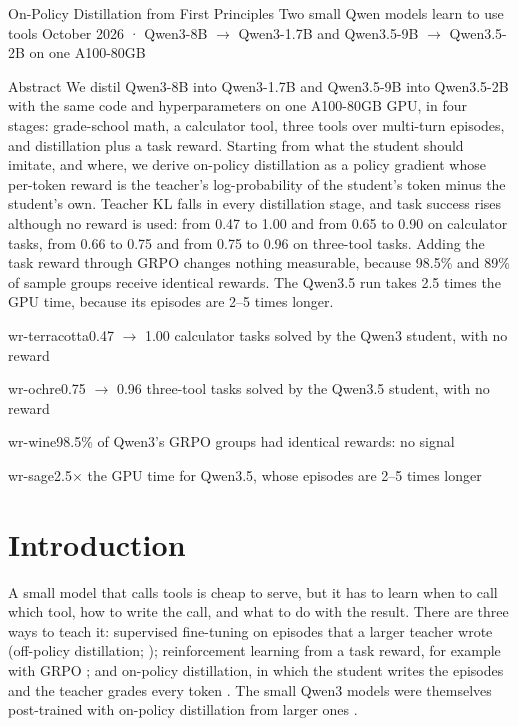 \documentclass[11pt,a4paper]{article}
\begin{document}
  {On-Policy Distillation from First Principles}
  {Two small Qwen models learn to use tools}
  {October 2026 · Qwen3-8B $\to$ Qwen3-1.7B and Qwen3.5-9B $\to$ Qwen3.5-2B
  on one A100-80GB}

\begin{wrabstract}{Abstract}
We distil Qwen3-8B into Qwen3-1.7B and Qwen3.5-9B into Qwen3.5-2B with the
same code and hyperparameters on one A100-80GB GPU, in four stages:
grade-school math, a calculator tool, three tools over multi-turn episodes,
and distillation plus a task reward. Starting from what the student should
imitate, and where, we derive on-policy distillation as a policy gradient
whose per-token reward is the teacher's log-probability of the student's
token minus the student's own. Teacher KL falls in every distillation stage,
and task success rises although no reward is used: from 0.47 to 1.00 and
from 0.65 to 0.90 on calculator tasks, from 0.66 to 0.75 and from 0.75 to
0.96 on three-tool tasks. Adding the task reward through GRPO changes nothing
measurable, because 98.5\% and 89\% of sample groups receive identical
rewards. The Qwen3.5 run takes 2.5 times the GPU time, because its episodes
are 2--5 times longer.
\end{wrabstract}

\begin{tcbraster}[raster columns=4, raster equal height,
    raster column skip=3mm]
\begin{stat}{wr-terracotta}{0.47 $\to$ 1.00}
calculator tasks solved by the Qwen3 student, with no reward
\end{stat}
\begin{stat}{wr-ochre}{0.75 $\to$ 0.96}
three-tool tasks solved by the Qwen3.5 student, with no reward
\end{stat}
\begin{stat}{wr-wine}{98.5\%}
of Qwen3's GRPO groups had identical rewards: no signal
\end{stat}
\begin{stat}{wr-sage}{2.5$\times$}
the GPU time for Qwen3.5, whose episodes are 2--5 times longer
\end{stat}
\end{tcbraster}

\section{Introduction}

A small model that calls tools is cheap to serve, but it has to learn when
to call which tool, how to write the call, and what to do with the result.
There are three ways to teach it: supervised fine-tuning on episodes that a
larger teacher wrote (off-policy distillation;
\citealp{kim2016seqkd}); reinforcement learning from a task
reward, for example with GRPO \citep{shao2024deepseekmath}; and on-policy
distillation, in which the student writes the episodes and the teacher
grades every token \citep{agarwal2024gkd,gu2024minillm,lu2025onpolicy}. The
small Qwen3 models were themselves post-trained with on-policy distillation
from larger ones \citep{yang2025qwen3}.
\end{document}
